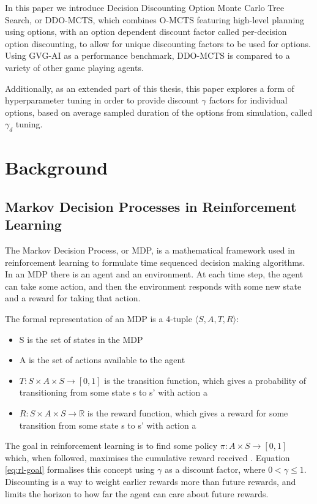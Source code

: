 \documentclass[12pt,a4paper]{article}
\begin{document}
\begin{multicols}{2}
In this paper we introduce Decision Discounting Option Monte Carlo Tree Search, or DDO-MCTS, which combines O-MCTS featuring high-level planning using options, with an option dependent discount factor called per-decision option discounting, to allow for unique discounting factors to be used for options. Using GVG-AI as a performance benchmark, DDO-MCTS is compared to a variety of other game playing agents.

Additionally, as an extended part of this thesis, this paper explores a form of hyperparameter tuning in order to provide discount $\gamma$ factors for individual options, based on average sampled duration of the options from simulation, called $\gamma_d$ tuning. 

\section{Background}
\subsection{Markov Decision Processes in Reinforcement Learning}
The Markov Decision Process, or MDP, is a mathematical framework used in reinforcement learning to formulate time sequenced decision making algorithms. In an MDP there is an agent and an environment. At each time step, the agent can take some action, and then the environment responds with some new state and a reward for taking that action.

The formal representation of an MDP is a 4-tuple $ \big \langle S, A, T, R \big \rangle$:
\begin{itemize}
  \itemsep0em 
  \item S is the set of states in the MDP
  \item A is the set of actions available to the agent
  \item $T: S \times A \times S \rightarrow \left[0,1\right]$ is the transition function, which gives a probability of transitioning from some state s to s' with action a
  \item $R: S \times A \times S \rightarrow \mathbb{R}$ is the reward function, which gives a reward for some transition from some state s to s' with action a
\end{itemize}

The goal in reinforcement learning is to find some policy $\pi: A \times S \rightarrow \left[0,1\right]$ which, when followed, maximises the cumulative reward received \cite{sutton1998reinforcement}.  Equation \eqref{eq:rl-goal} formalises this concept using $\gamma$ as a discount factor, where $0 < \gamma \leqslant 1$. Discounting is a way to weight earlier rewards more than future rewards, and limits the horizon to how far the agent can care about future rewards.


\end{multicols}
\end{document}
